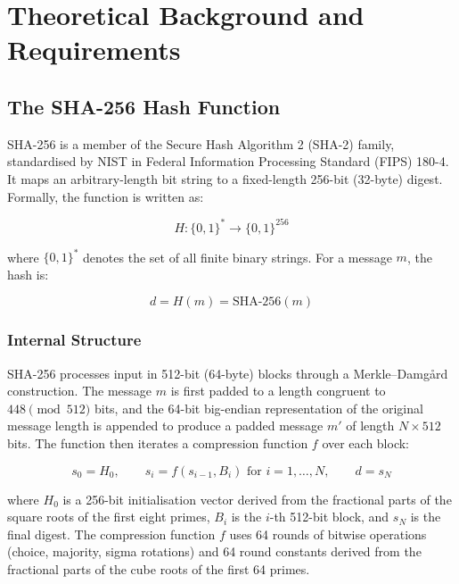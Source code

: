 \chapter{Theoretical Background and Requirements}
\label{chap:theory}

\section{The SHA-256 Hash Function}
\label{sec:theory_sha256}

SHA-256 is a member of the Secure Hash Algorithm 2 (SHA-2) family, standardised by NIST in Federal Information Processing Standard (FIPS) 180-4. It maps an arbitrary-length bit string to a fixed-length 256-bit (32-byte) digest. Formally, the function is written as:

\begin{equation}
  H : \{0,1\}^{*} \to \{0,1\}^{256}
  \label{eq:sha256_domain}
\end{equation}

\noindent where $\{0,1\}^{*}$ denotes the set of all finite binary strings. For a message $m$, the hash is:

\begin{equation}
  d = H(m) = \mathrm{SHA\text{-}256}(m)
  \label{eq:sha256_notation}
\end{equation}

\subsection{Internal Structure}
\label{sec:theory_sha256_internal}

SHA-256 processes input in 512-bit (64-byte) blocks through a Merkle--Damg\r{a}rd construction. The message $m$ is first padded to a length congruent to $448 \pmod{512}$ bits, and the 64-bit big-endian representation of the original message length is appended to produce a padded message $m'$ of length $N \times 512$ bits. The function then iterates a compression function $f$ over each block:

\begin{equation}
  s_0 = H_0, \qquad s_i = f(s_{i-1}, B_i) \text{ for } i = 1, \ldots, N, \qquad d = s_N
  \label{eq:sha256_merkle}
\end{equation}

\noindent where $H_0$ is a 256-bit initialisation vector derived from the fractional parts of the square roots of the first eight primes, $B_i$ is the $i$-th 512-bit block, and $s_N$ is the final digest. The compression function $f$ uses 64 rounds of bitwise operations (choice, majority, sigma rotations) and 64 round constants derived from the fractional parts of the cube roots of the first 64 primes.

